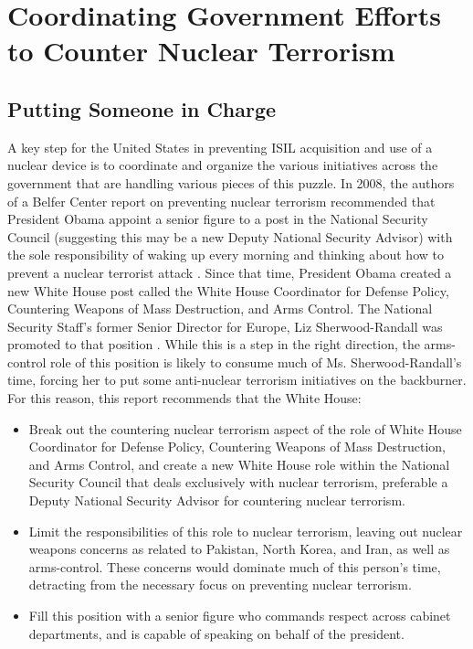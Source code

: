 \documentclass{report}
\begin{document}
\section{Coordinating Government Efforts to Counter Nuclear Terrorism}

\subsection{Putting Someone in Charge}

A key step for the United States in preventing ISIL acquisition and use of a nuclear device is to coordinate and organize the various initiatives across the government that are handling various pieces of this puzzle. In 2008, the authors of a Belfer Center report on preventing nuclear terrorism recommended that President Obama appoint a senior figure to a post in the National Security Council (suggesting this may be a new Deputy National Security Advisor) with the sole responsibility of waking up every morning and thinking about how to prevent a nuclear terrorist attack \cite{Bronner2008}. Since that time, President Obama created a new White House post called the White House Coordinator for Defense Policy, Countering Weapons of Mass Destruction, and Arms Control. The National Security Staff's former Senior Director for Europe, Liz Sherwood-Randall was promoted to that position \cite{Rogin2013}. While this is a step in the right direction, the arms-control role of this position is likely to consume much of Ms. Sherwood-Randall's time, forcing her to put some anti-nuclear terrorism initiatives on the backburner. For this reason, this report recommends that the White House:

\begin{itemize}
 \item Break out the countering nuclear terrorism aspect of the role of White House Coordinator for Defense Policy, Countering Weapons of Mass Destruction, and Arms Control, and create a new White House role within the National Security Council that deals exclusively with nuclear terrorism, preferable a Deputy National Security Advisor for countering nuclear terrorism. 
 \item Limit the responsibilities of this role to nuclear terrorism, leaving out nuclear weapons concerns as related to Pakistan, North Korea, and Iran, as well as arms-control. These concerns would dominate much of this person's time, detracting from the necessary focus on preventing nuclear terrorism.
 \item Fill this position with a senior figure who commands respect across cabinet departments, and is capable of speaking on behalf of the president.
\end{itemize}
\end{document}
